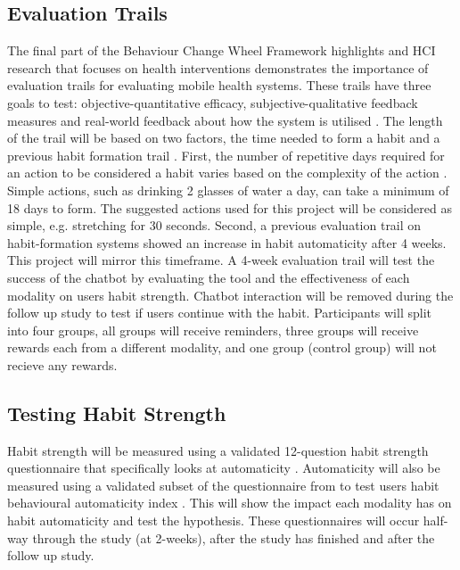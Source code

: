 \subsection{Evaluation Trails}
The final part of the Behaviour Change Wheel Framework highlights and HCI research that focuses on health interventions \cite{article_mhealth} demonstrates the importance of evaluation trails for evaluating mobile health systems. These trails have three goals to test: objective-quantitative efficacy, subjective-qualitative feedback measures and real-world feedback about how the system is utilised \cite{article_evaluate_tech_health_behaviour_change}.\newline
\newline
The length of the trail will be based on two factors, the time needed to form a habit \cite{article_how_habits_formed_modelling_habit_formation} and a previous habit formation trail \cite{article_beyond_self_tracking_designing_apps}. First, the number of repetitive days required for an action to be considered a habit varies based on the complexity of the action \cite{article_how_habits_formed_modelling_habit_formation}. Simple actions, such as drinking 2 glasses of water a day, can take a minimum of 18 days to form. The suggested actions used for this project will be considered as simple, e.g. stretching for 30 seconds. Second, a previous evaluation trail on habit-formation systems \cite{article_how_habits_formed_modelling_habit_formation} showed an increase in habit automaticity after 4 weeks. This project will mirror this timeframe.\newline
\newline
A 4-week evaluation trail will test the success of the chatbot by evaluating the tool and the effectiveness of each modality on users habit strength. Chatbot interaction will be removed during the follow up study to test if users continue with the habit. Participants will split into four groups, all groups will receive reminders, three groups will receive rewards each from a different modality, and one group (control group) will not recieve any rewards.

\subsection{Testing Habit Strength}
Habit strength will be measured using a validated 12-question habit strength questionnaire that specifically looks at automaticity \cite{article_habit_strength}. Automaticity will also be measured using a validated subset of the questionnaire from \cite{article_habit_strength} to test users habit behavioural automaticity index \cite{article_habit_measurement}. This will show the impact each modality has on habit automaticity and test the hypothesis. These questionnaires \cite{article_habit_strength, article_habit_measurement} will occur half-way through the study (at 2-weeks), after the study has finished and after the follow up study.
